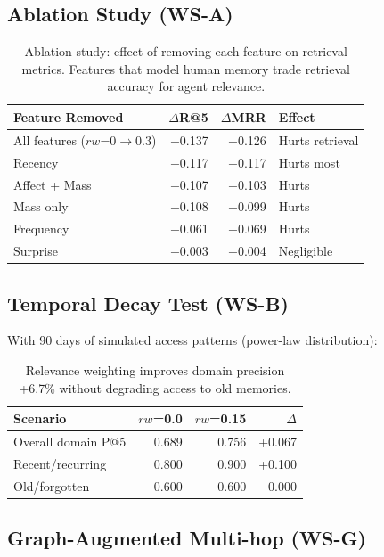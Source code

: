 \documentclass[11pt]{article}
\begin{document}
\subsection{Ablation Study (WS-A)}

\begin{table}[h]
\centering
\begin{tabular}{lrrl}
\toprule
Feature Removed & $\Delta$R@5 & $\Delta$MRR & Effect \\
\midrule
All features ($rw$=0$\rightarrow$0.3) & $-$0.137 & $-$0.126 & Hurts retrieval \\
Recency & $-$0.117 & $-$0.117 & Hurts most \\
Affect + Mass & $-$0.107 & $-$0.103 & Hurts \\
Mass only & $-$0.108 & $-$0.099 & Hurts \\
Frequency & $-$0.061 & $-$0.069 & Hurts \\
Surprise & $-$0.003 & $-$0.004 & Negligible \\
\bottomrule
\end{tabular}
\caption{Ablation study: effect of removing each feature on retrieval metrics.
Features that model human memory trade retrieval accuracy for agent relevance.}
\label{tab:ablation}
\end{table}

\subsection{Temporal Decay Test (WS-B)}

With 90 days of simulated access patterns (power-law distribution):

\begin{table}[h]
\centering
\begin{tabular}{lrrr}
\toprule
Scenario & $rw$=0.0 & $rw$=0.15 & $\Delta$ \\
\midrule
Overall domain P@5 & 0.689 & 0.756 & +0.067 \\
Recent/recurring & 0.800 & 0.900 & +0.100 \\
Old/forgotten & 0.600 & 0.600 & 0.000 \\
\bottomrule
\end{tabular}
\caption{Relevance weighting improves domain precision +6.7\% without
degrading access to old memories.}
\label{tab:temporal}
\end{table}

\subsection{Graph-Augmented Multi-hop (WS-G)}
\end{document}
